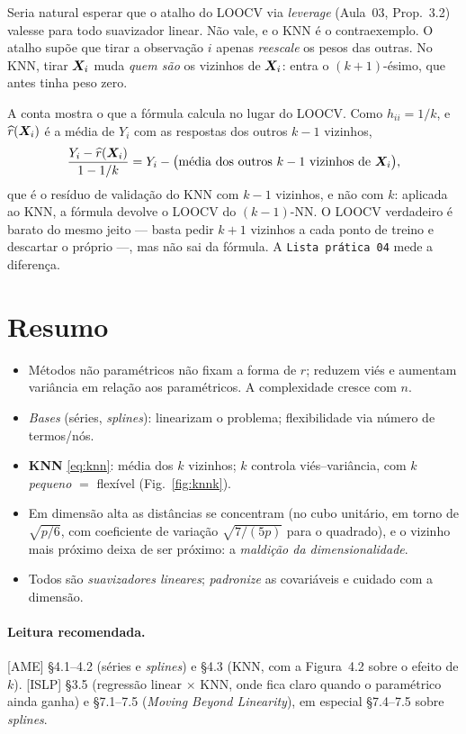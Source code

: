\documentclass[11pt,a4paper]{article}
\begin{document}
\begin{atencao}
Seria natural esperar que o atalho do LOOCV via \emph{leverage} (Aula~03, Prop.~3.2)
valesse para todo suavizador linear. Não vale, e o KNN é o contraexemplo. O atalho
supõe que tirar a observação $i$ apenas \emph{reescale} os pesos das outras. No KNN,
tirar $\bm{X}_i$ muda \emph{quem são} os vizinhos de $\bm{X}_i$: entra o $(k+1)$-ésimo, que
antes tinha peso zero.

A conta mostra o que a fórmula calcula no lugar do LOOCV. Como $h_{ii}=1/k$, e
$\widehat{r}(\bm{X}_i)$ é a média de $Y_i$ com as respostas dos outros $k-1$ vizinhos,
\[
  \frac{Y_i-\widehat{r}(\bm{X}_i)}{1-1/k}
  = Y_i-\big(\text{média dos outros } k-1 \text{ vizinhos de } \bm{X}_i\big),
\]
que é o resíduo de validação do KNN com $k-1$ vizinhos, e não com $k$: aplicada ao
KNN, a fórmula devolve o LOOCV do $(k-1)$-NN. O LOOCV verdadeiro é barato do mesmo
jeito --- basta pedir $k+1$ vizinhos a cada ponto de treino e descartar o próprio
---, mas não sai da fórmula. A \texttt{Lista prática 04} mede a diferença.
\end{atencao}

\section*{Resumo}
\begin{itemize}[leftmargin=1.4cm]
  \item Métodos não paramétricos não fixam a forma de $r$; reduzem viés e aumentam
        variância em relação aos paramétricos. A complexidade cresce com $n$.
  \item \emph{Bases} (séries, \emph{splines}): linearizam o problema; flexibilidade
        via número de termos/nós.
  \item \textbf{KNN} \eqref{eq:knn}: média dos $k$ vizinhos; $k$ controla
        viés--variância, com $k$ \emph{pequeno} $=$ flexível
        (Fig.~\ref{fig:knnk}).
  \item Em dimensão alta as distâncias se concentram (no cubo unitário, em torno de
        $\sqrt{p/6}$, com coeficiente de variação $\sqrt{7/(5p)}$ para o quadrado), e o
        vizinho mais próximo deixa de ser próximo: a \emph{maldição da
        dimensionalidade}.
  \item Todos são \emph{suavizadores lineares}; \emph{padronize} as covariáveis e
        cuidado com a dimensão.
\end{itemize}

\paragraph{Leitura recomendada.} [AME] §4.1--4.2 (séries e \emph{splines}) e §4.3
(KNN, com a Figura~4.2 sobre o efeito de $k$). [ISLP] §3.5 (regressão linear
$\times$ KNN, onde fica claro quando o paramétrico ainda ganha) e §7.1--7.5
(\emph{Moving Beyond Linearity}), em especial §7.4--7.5 sobre \emph{splines}.
\end{document}
